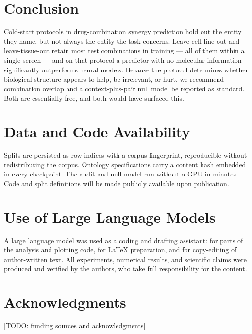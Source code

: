 \documentclass{ws-procs11x85}
\begin{document}
\section{Conclusion}

Cold-start protocols in drug-combination synergy prediction hold out the entity
they name, but not always the entity the task concerns. Leave-cell-line-out and
leave-tissue-out retain most test combinations in training --- all of them within
a single screen --- and on that protocol a predictor with no molecular
information significantly outperforms neural models. Because the protocol
determines whether biological structure appears to help, be irrelevant, or hurt,
we recommend combination overlap and a context-plus-pair null model be reported
as standard. Both are essentially free, and both would have surfaced this.

\section*{Data and Code Availability}

Splits are persisted as row indices with a corpus fingerprint, reproducible
without redistributing the corpus. Ontology specifications carry a content hash
embedded in every checkpoint. The audit and null model run without a GPU in
minutes. Code and split definitions will be made publicly available upon
publication.

\section*{Use of Large Language Models}

A large language model was used as a coding and drafting assistant: for parts of
the analysis and plotting code, for LaTeX preparation, and for copy-editing of
author-written text. All experiments, numerical results, and scientific claims
were produced and verified by the authors, who take full responsibility for the
content.

\section*{Acknowledgments}

[TODO: funding sources and acknowledgments]
\end{document}

